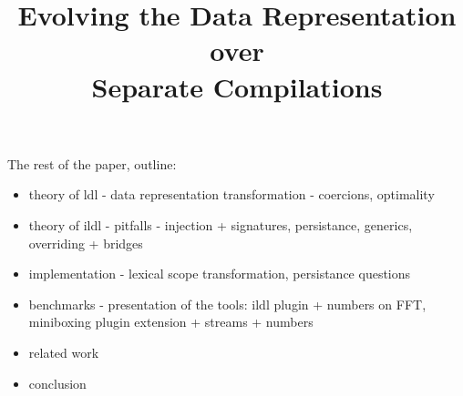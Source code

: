 \documentclass[runningheads,a4paper]{style/llncs}
\begin{document}
\mainmatter

\title{Evolving the Data Representation over\\Separate Compilations}
\maketitle




The rest of the paper, outline:
\begin{itemize}
  \item theory of ldl - data representation transformation - coercions, optimality
  \item theory of ildl - pitfalls - injection + signatures, persistance, generics, overriding + bridges
  \item implementation - lexical scope transformation, persistance questions
  \item benchmarks - presentation of the tools: ildl plugin + numbers on FFT, miniboxing plugin extension + streams + numbers
  \item related work
  \item conclusion
\end{itemize}



\end{document}
